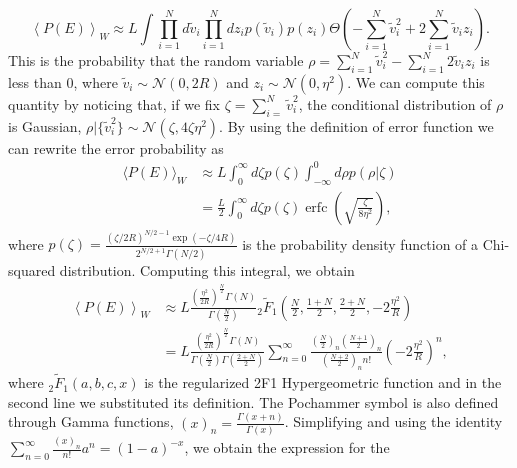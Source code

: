 \documentclass[a4paper]{article}%
\DeclareMathOperator\erfc{erfc}
\begin{document}
\begin{equation}
\left\langle P(E)\right\rangle _{W} \approx L \int\prod_{i=1}^{N} d \tilde
{v}_{i} \prod_{i=1}^{N} dz_{i} p(\tilde{v}_{i}) p(z_{i}) \Theta\left(
-\sum_{i=1}^{N} \tilde{v}^{2}_{i} +2\sum_{i=1}^{N} \tilde{v}_{i} z_{i}\right)
.
\end{equation}
This is the probability that the random variable $\rho= \sum_{i=1}^N \tilde{v}_{i}^{2} -
\sum_{i=1}^{N}2\tilde{v}_{i} z_{i}$ is less than 0, where $\tilde{v}_{i} \sim\mathcal{N}%
(0,2R)$ and $z_{i} \sim\mathcal{N}(0,\eta^{2})$. We can compute this quantity
by noticing that, if we fix $\zeta= \sum_{i=}^N \tilde{v}^{2}_{i}$, the
conditional distribution of $\rho$ is Gaussian, $\rho|\{\tilde{v}_{i}^{2}\}
\sim\mathcal{N}(\zeta,4\zeta\eta^{2}) $. By using the definition of error
function we can rewrite the error probability as
\begin{equation}%
\begin{split}
\langle P(E)\rangle_{W}  &  \approx L\int_{0}^{\infty}d\zeta p(\zeta)
\int_{-\infty}^{0} d\rho p(\rho|\zeta)\\
&  = \frac{L}{2}\int_{0}^{\infty}d\zeta p(\zeta)
\erfc{\left(\sqrt{\frac{\zeta}{8\eta^2}}\right)},
\end{split}
\end{equation}
where $p(\zeta) = \frac{(\zeta/2R)^{N/2 -1}\exp\left(  - \zeta/4R\right)
}{2^{N/2 +1} \Gamma(N/2)}$ is the probability density function of a
Chi-squared distribution. Computing this integral, we obtain
\begin{equation}%
\begin{split}
\left\langle P(E)\right\rangle _{W}  &  \approx L \frac{(\frac{\eta^{2}}
{2R})^{\frac{N}{2}}\Gamma(N)}{\Gamma(\frac{N}{2})} {}_{2}\tilde{F}_{1}\left(
\frac{N}{2},\frac{1+N}{2},\frac{2+N}{2},-2\frac{\eta^{2}}{R} \right) \\
&  =L \frac{\left(  \frac{\eta^{2}}{2R}\right)  ^{\frac{N}{2}}\Gamma\left(
N\right)  }{\Gamma\left(  \frac{N} {2}\right)  \Gamma\left(  \frac{2+N}%
{2}\right)  }\sum_{n=0}^{\infty}\frac{\left(  \frac{N}{2}\right)  _{n} \left(
\frac{N+1}{2}\right)  _{n}}{\left(  \frac{N+2}{2}\right)  _{n} n!} \left(
-2\frac{\eta^{2}}{R}\right)  ^{n},
\end{split}
\end{equation}
where ${}_{2}\tilde{F}_{1}(a,b,c,x)$ is the regularized 2F1 Hypergeometric
function and in the second line we substituted its definition. The Pochammer
symbol is also defined through Gamma functions, $(x)_{n} = \frac{\Gamma
(x+n)}{\Gamma(x)}$. Simplifying and using the identity $\sum_{n=0}^{\infty
}\frac{(x)_{n}}{n!} a^{n} = (1-a)^{-x}$, we obtain the expression for the
\end{document}
